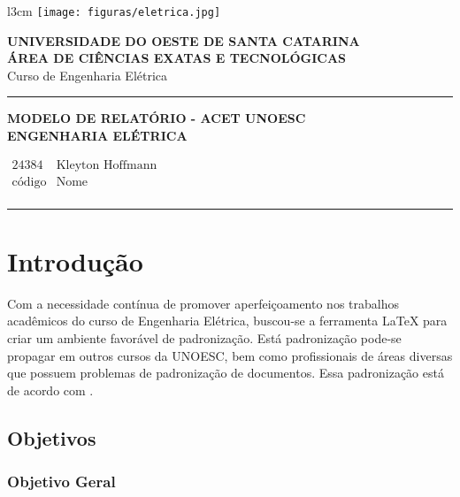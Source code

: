 \documentclass[a4paper,12pt,ruledheader,onecolumn,ceqn]{article}
\newcommand{\HorRule}[1]{\noindent\rule{\linewidth}{#1}}
\begin{document}
\begin{wrapfigure}[2]{l}{3cm}
\vspace{-0.4cm}
\texttt{[image: figuras/eletrica.jpg]}
\end{wrapfigure} 

\hspace*{1.2cm} \textbf{UNIVERSIDADE DO OESTE DE SANTA CATARINA} \\
\hspace*{2.1cm} \textbf{ÁREA DE CIÊNCIAS EXATAS E TECNOLÓGICAS} \\
\hspace*{8.0cm} Curso de Engenharia Elétrica 

\HorRule{1.0pt}  			%
\begin{center}
\large\textrm{\textbf{MODELO DE RELATÓRIO - ACET UNOESC \\ ENGENHARIA ELÉTRICA}} 
\end{center}

\vspace{0.5cm}
\hspace{-1.05cm}
$\left. \begin{array}{ll} 
\mbox{24384} & \mbox{Kleyton Hoffmann} \\
\mbox{código} & \mbox{Nome} \\
\end{array} \right.$

\HorRule{1.0pt}  			%


\section{Introdução}

Com a necessidade contínua de promover aperfeiçoamento nos trabalhos acadêmicos do curso de Engenharia Elétrica, buscou-se a ferramenta \LaTeX \cite{abntex2modelo} para criar um ambiente favorável de padronização. Está padronização pode-se propagar em outros cursos da UNOESC, bem como profissionais de áreas diversas que possuem problemas de padronização de documentos. Essa padronização está de acordo com . 

\subsection{Objetivos}

\subsubsection{Objetivo Geral}
\end{document}
